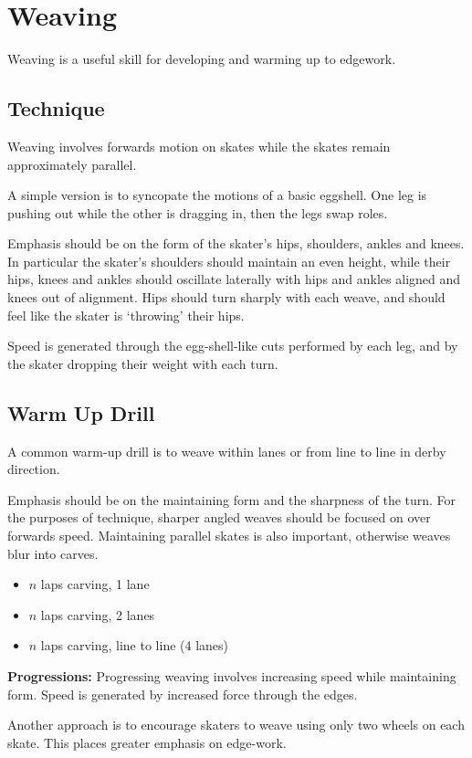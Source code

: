 \section{Weaving}
\label{sec:sticky/weaves}

Weaving is a useful skill for developing and warming up to edgework. 

\subsection*{Technique}

Weaving involves forwards motion on skates while the skates remain approximately parallel.   

A simple version is to syncopate the motions of a basic eggshell.  
One leg is pushing out while the other is dragging in, then the legs swap roles. 

Emphasis should be on the form of the skater's hips, shoulders, ankles and knees. 
In particular the skater's shoulders should maintain an even height, while their hips, knees and ankles should oscillate laterally with hips and ankles aligned and knees out of alignment.    
Hips should turn sharply with each weave, and should feel like the skater is `throwing' their hips. 


Speed is generated through the egg-shell-like cuts performed by each leg, and by the skater dropping their weight with each turn.  

\subsection*{Warm Up Drill}
\label{drill:sticky/weaves/warm_up}

A common warm-up drill is to weave within lanes or from line to line in derby direction.

Emphasis should be on the maintaining form and the sharpness of the turn. 
For the purposes of technique, sharper angled weaves should be focused on over forwards speed.
Maintaining parallel skates is also important, otherwise weaves blur into carves. 

\begin{itemize}
\item $n$ laps carving, 1 lane 
\item $n$ laps carving, 2 lanes
\item $n$ laps carving, line to line (4 lanes)
\end{itemize}


{\bf Progressions:}
Progressing weaving involves increasing speed while maintaining form.   
Speed is generated by increased force through the edges.  

Another approach is to encourage skaters to weave using only two wheels on each skate. This places greater emphasis on edge-work. 
